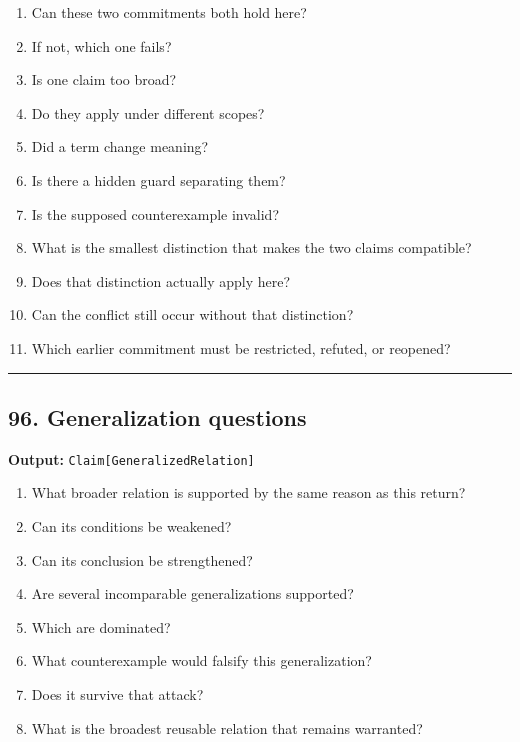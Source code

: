 \documentclass[
]{article}
\providecommand{\tightlist}{%
  \setlength{\itemsep}{0pt}\setlength{\parskip}{0pt}}
\begin{document}
\begin{enumerate}
\def\labelenumi{\arabic{enumi}.}
\tightlist
\item
  Can these two commitments both hold here?
\item
  If not, which one fails?
\item
  Is one claim too broad?
\item
  Do they apply under different scopes?
\item
  Did a term change meaning?
\item
  Is there a hidden guard separating them?
\item
  Is the supposed counterexample invalid?
\item
  What is the smallest distinction that makes the two claims compatible?
\item
  Does that distinction actually apply here?
\item
  Can the conflict still occur without that distinction?
\item
  Which earlier commitment must be restricted, refuted, or reopened?
\end{enumerate}

\begin{center}\rule{0.5\linewidth}{0.5pt}\end{center}

\subsection{96. Generalization
questions}\label{generalization-questions}

\textbf{Output:} \texttt{Claim{[}GeneralizedRelation{]}}

\begin{enumerate}
\def\labelenumi{\arabic{enumi}.}
\tightlist
\item
  What broader relation is supported by the same reason as this return?
\item
  Can its conditions be weakened?
\item
  Can its conclusion be strengthened?
\item
  Are several incomparable generalizations supported?
\item
  Which are dominated?
\item
  What counterexample would falsify this generalization?
\item
  Does it survive that attack?
\item
  What is the broadest reusable relation that remains warranted?
\end{enumerate}
\end{document}
